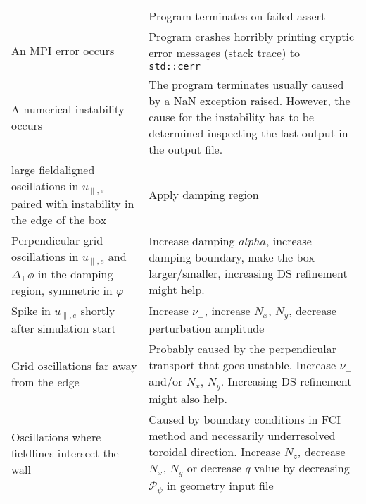 \begin{longtable}{p{6cm}p{8cm}}
&
Program terminates on failed assert
    \\
An MPI error occurs
&
Program crashes horribly printing cryptic error messages (stack trace) to \texttt{std::cerr}
    \\
A numerical instability occurs
&
The program terminates usually caused by a NaN exception raised. However,
the cause for the instability has to be determined inspecting the
last output in the output file.
    \\
\qquad large fieldaligned oscillations in $u_{\parallel,e}$ paired with instability in the edge of the box
&
Apply damping region
    \\
\qquad Perpendicular grid oscillations in $u_{\parallel,e}$ and $\Delta_\perp \phi$ in the damping region, symmetric in $\varphi$
&
Increase damping $alpha$, increase damping boundary, make the box larger/smaller, increasing DS refinement might help.
    \\
\qquad Spike in $u_{\parallel,e}$ shortly after simulation start
&
Increase $\nu_\perp$, increase $N_x$, $N_y$, decrease perturbation amplitude
    \\
\qquad Grid oscillations far away from the edge
&
Probably caused by the perpendicular transport that goes unstable. Increase $\nu_\perp$ and/or $N_x$, $N_y$. Increasing DS refinement might also help.
\\
\qquad Oscillations where fieldlines intersect the wall
&
Caused by boundary conditions in FCI method and necessarily underresolved toroidal direction.
Increase $N_z$, decrease $N_x$, $N_y$ or decrease $q$ value by decreasing $\mathcal P_\psi$ in geometry input file
\\
\bottomrule
\end{longtable}




